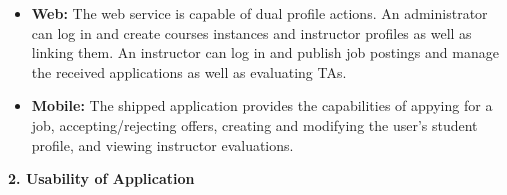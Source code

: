 \documentclass[12pt]{article}
\begin{document}
\begin{itemize}
	\item \textbf{Web:} The web service is capable of dual profile actions. An administrator can log in and create courses instances and instructor profiles as well as linking them. An instructor can log in and publish job postings and manage the received applications as well as evaluating TAs.
    
	\item \textbf{Mobile:} The shipped application provides the capabilities of appying for a job,
		accepting/rejecting offers, creating and modifying the user's student profile, and viewing
		instructor evaluations. 

\end{itemize}

\textbf{2. Usability of Application}
\end{document}
